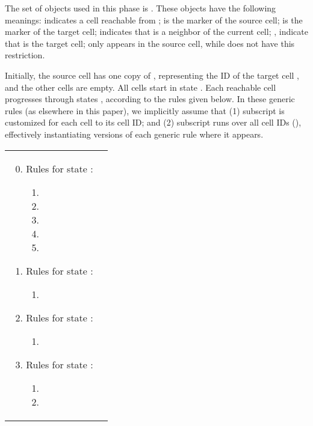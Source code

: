 \documentclass[preliminary,copyright,creativecommons]{eptcs}
\theoremstyle{remark}
\begin{document}
The set of objects used in this phase is 
.
These objects have the following meanings:
 indicates a cell reachable from ;
 is the marker of the source cell;
 is the marker of the target cell;
 indicates that  is a neighbor of the current cell;
,  indicate that  is the target cell;
 only appears in the source cell, while  does not have this restriction.

Initially, the source cell  has one copy of , 
representing the ID of the target cell ,
and the other cells are empty.
All cells start in state .
Each reachable cell progresses through states ,
according to the rules given below.
In these generic rules (as elsewhere in this paper), we implicitly assume that
(1) subscript  is customized for each cell to its cell ID;
and (2) subscript  runs over all cell IDs (),
effectively instantiating  versions of each generic rule where it appears. 

\begin{tabular}[t]{ll}
  \begin{minipage}[t]{3.0in}
  \begin{enumerate}
  \setcounter{enumi}{-1}
  \item Rules for state :
    \begin{enumerate}[1]
    \item 
    \item 
    \item 
  
    \item 
    \item 
    \end{enumerate}
  \end{enumerate}
  \end{minipage}

  \begin{minipage}[t]{3.0in}
  \begin{enumerate}
  \setcounter{enumi}{0}
  \item Rules for state :
    \begin{enumerate}[1]
    \item 
    \end{enumerate}
  \item Rules for state :
    \begin{enumerate}[1]
    \item 
    \end{enumerate}
  \item Rules for state :
    \begin{enumerate}[1]
    \item 
    \item 
    \end{enumerate}
  \end{enumerate}
  \end{minipage}
\end{tabular}
\end{document}
